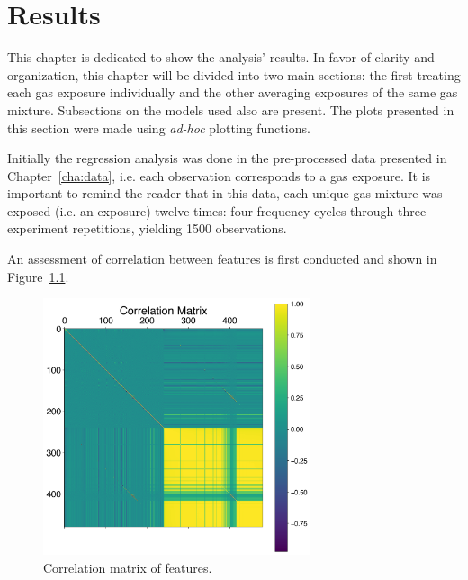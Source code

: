 
\chapter{Results}
\label{cha:results}

This chapter is dedicated to show the analysis' results. In favor of clarity and organization, this chapter will be divided into two main sections: the first treating each gas exposure individually and the other averaging exposures of the same gas mixture. Subsections on the models used also are present. The plots presented in this section were made using \textit{ad-hoc} plotting functions.

Initially the regression analysis was done in the pre-processed data presented in Chapter~\ref{cha:data}, i.e. each observation corresponds to a gas exposure. It is important to remind the reader that in this data, each unique gas mixture was exposed (i.e. an exposure) twelve times: four frequency cycles through three experiment repetitions, yielding 1500 observations. 

An assessment of correlation between features is first conducted and shown in Figure~\ref{fig:cor-mat}.

\begin{figure}[h]
	\centering
	\includegraphics[width=0.7\textwidth]{../figures/correlation-matrix.png}
	\caption{Correlation matrix of features.}
	\label{fig:cor-mat}
\end{figure}

